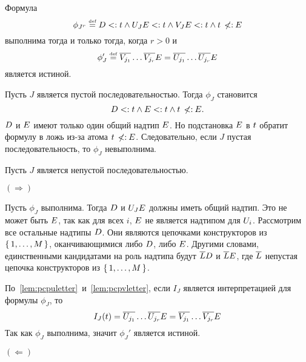 \begin{lem}{\label{lem:pcpphij}}
    Формула
\[
    \phi_{J^r} \mathrel{\stackrel{\mbox{\normalfont\tiny def}}{=}} D <: t \land {U}_{J}{E} <: t \land {V}_{J}{E} <: t \land t \:\not\!\!{<:}\: {E}
\]
выполнима тогда и только тогда, когда $r > 0$ и
\[
 \phi'_{J} \mathrel{\stackrel{\mbox{\normalfont\tiny def}}{=}} \overline{{V}_{j_1}}\ldots\overline{{V}_{j_r}}{E} = \overline{{U}_{j_1}}\ldots\overline{{U}_{j_r}}{E}
\] является истиной.
\end{lem}
\begin{proof*}
Пусть $J$ является пустой последовательностью. Тогда $\phi_{J}$ становится
\[
    D <: t \land {E} <: t \land t \:\not\!\!{<:}\: {E}.
\]
$D$ и ${E}$ имеют только один общий надтип ${E}$. Но подстановка ${E}$ в $t$ обратит формулу в ложь из-за атома $t \:\not\!\!{<:}\: {E}$. Следовательно, если $J$ пустая последовательность, то $\phi_{J}$ невыполнима.

Пусть $J$ является непустой последовательностью.

$(\Rightarrow)$

Пусть $\phi_{J}$ выполнима. Тогда $D$ и ${U}_{J}{E}$ должны иметь общий надтип. Это не может быть ${E}$, так как для всех $i$, ${E}$ не является надтипом для ${U}_{i}$. Рассмотрим все остальные надтипы $D$. Они являются цепочками конструкторов из $\lbrace \, {1},\ldots,{M} \, \rbrace$, оканчивающимися либо $D$, либо ${E}$. Другими словами, единственными кандидатами на роль надтипа будут $\overline{{L}{}}D$ и $\overline{{L}{}}{E}$, где $\overline{{L}{}}$ непустая цепочка конструкторов из $\lbrace \, {1},\ldots,{M} \, \rbrace$.

По~\autoref{lem:pcpuletter}~и~\autoref{lem:pcpvletter}, если $I_{J}$ является интерпретацией для формулы $\phi_{J}$, то
\[
I_{J}(t) = \overline{{U}_{j_1}} \ldots \overline{{U}_{j_r}}{E} = \overline{{V}_{j_1}} \ldots \overline{{V}_{j_r}}{E}
\]
Так как $\phi_{J}$ выполнима, значит $\phi_{J}'$ является истиной.

$(\Leftarrow)$


\end{proof*}
